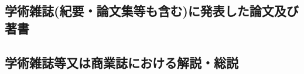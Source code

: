 \documentclass[11pt,a4paper,twoside]{jarticle}
\newcommand{\研究課題名}{象の卵}
\newcommand{\研究機関名}{逢坂大学}
\newcommand{\申請者氏名}{湯川秀樹}
\newcommand{\研究代表者氏名}{\申請者氏名}
\newcommand{\研究期間の最終元号年度}{29}	%
\begin{document}
\subsection{学術雑誌(紀要・論文集等も含む)に発表した論文及び著書}
\newcommand{\学術雑誌等に発表した論文または著書}{%
	
	\begin{enumerate}
		\item[](査読有り)%
		\item \underline{H. Yukawa}$^1$, J. Kara$^2$,
				``Theory of Elephant Eggs'', 
				Phys.\ Rev.\ Lett. {\bf 800}, 800-804 (2005). 
				
		\item F.~Ehrlich, \underline{H. Yukawa}$^1$,
				``You can't Lay an Egg If You're an Elephant'', 
				JofUR\\
				 ({\tt www.universalrejection.org}), {\bf N/A}, N/A (2002).

		\item[](査読なし)%
		\item Kobo Abe$^3$, \underline{H. Yukawa}$^1$, 
				``仔象は死んだ'', 
				安部公房全集, {\bf 26}, 100-200, (2004).
	\end{enumerate}
	他５報\\
	注：著者の所属・職（論文発表時）\\
	1: 大阪大学理学研究科大学院生、
	2: 明治大学文学部学生、
	3: 東京帝国大学医学部学生、
	4: ミッキー大学教授、
	5: Univ. of Zoo大学院生
}

\subsection{学術雑誌等又は商業誌における解説・総説}
\newcommand{\学術雑誌等または商業誌における解説や総説}{%
	\begin{enumerate}
		\item R.~Kipling, \underline{H. Yukawa},
				``The Elephant's Child (象の鼻はなぜ長い)'', 
				Nature, {\bf 999}, 777-779, (2003).
	\end{enumerate}
	他２件
}
\end{document}
